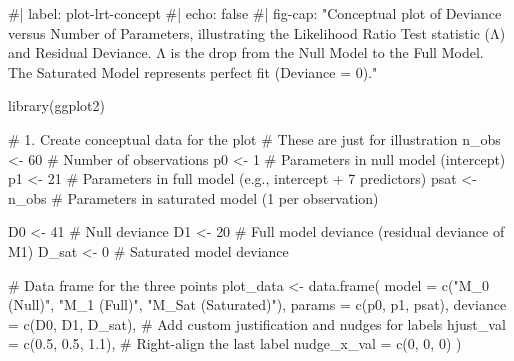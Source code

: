 \documentclass[
  letterpaper,
]{scrbook}
\newenvironment{Shaded}{\begin{snugshade}}{\end{snugshade}}
\newcommand{\AttributeTok}[1]{\textcolor[rgb]{0.40,0.45,0.13}{#1}}
\newcommand{\CommentTok}[1]{\textcolor[rgb]{0.37,0.37,0.37}{#1}}
\newcommand{\DecValTok}[1]{\textcolor[rgb]{0.68,0.00,0.00}{#1}}
\newcommand{\FloatTok}[1]{\textcolor[rgb]{0.68,0.00,0.00}{#1}}
\newcommand{\FunctionTok}[1]{\textcolor[rgb]{0.28,0.35,0.67}{#1}}
\newcommand{\NormalTok}[1]{\textcolor[rgb]{0.00,0.23,0.31}{#1}}
\newcommand{\OtherTok}[1]{\textcolor[rgb]{0.00,0.23,0.31}{#1}}
\newcommand{\StringTok}[1]{\textcolor[rgb]{0.13,0.47,0.30}{#1}}
\begin{document}
\begin{Shaded}
\begin{Highlighting}[]
\CommentTok{\#| label: plot{-}lrt{-}concept}
\CommentTok{\#| echo: false}
\CommentTok{\#| fig{-}cap: "Conceptual plot of Deviance versus Number of Parameters, illustrating the Likelihood Ratio Test statistic (Λ) and Residual Deviance. Λ is the drop from the Null Model to the Full Model. The Saturated Model represents perfect fit (Deviance = 0)."}

\FunctionTok{library}\NormalTok{(ggplot2)}

\CommentTok{\# 1. Create conceptual data for the plot}
\CommentTok{\# These are just for illustration}
\NormalTok{n\_obs }\OtherTok{\textless{}{-}} \DecValTok{60} \CommentTok{\# Number of observations}
\NormalTok{p0 }\OtherTok{\textless{}{-}} \DecValTok{1}     \CommentTok{\# Parameters in null model (intercept)}
\NormalTok{p1 }\OtherTok{\textless{}{-}} \DecValTok{21}    \CommentTok{\# Parameters in full model (e.g., intercept + 7 predictors)}
\NormalTok{psat }\OtherTok{\textless{}{-}}\NormalTok{ n\_obs }\CommentTok{\# Parameters in saturated model (1 per observation)}

\NormalTok{D0 }\OtherTok{\textless{}{-}} \DecValTok{41} \CommentTok{\# Null deviance}
\NormalTok{D1 }\OtherTok{\textless{}{-}} \DecValTok{20} \CommentTok{\# Full model deviance (residual deviance of M1)}
\NormalTok{D\_sat }\OtherTok{\textless{}{-}} \DecValTok{0} \CommentTok{\# Saturated model deviance}

\CommentTok{\# Data frame for the three points}
\NormalTok{plot\_data }\OtherTok{\textless{}{-}} \FunctionTok{data.frame}\NormalTok{(}
  \AttributeTok{model =} \FunctionTok{c}\NormalTok{(}\StringTok{"M\_0 (Null)"}\NormalTok{, }\StringTok{"M\_1 (Full)"}\NormalTok{, }\StringTok{"M\_Sat (Saturated)"}\NormalTok{),}
  \AttributeTok{params =} \FunctionTok{c}\NormalTok{(p0, p1, psat),}
  \AttributeTok{deviance =} \FunctionTok{c}\NormalTok{(D0, D1, D\_sat),}
  \CommentTok{\# Add custom justification and nudges for labels}
  \AttributeTok{hjust\_val =} \FunctionTok{c}\NormalTok{(}\FloatTok{0.5}\NormalTok{, }\FloatTok{0.5}\NormalTok{, }\FloatTok{1.1}\NormalTok{), }\CommentTok{\# Right{-}align the last label}
  \AttributeTok{nudge\_x\_val =} \FunctionTok{c}\NormalTok{(}\DecValTok{0}\NormalTok{, }\DecValTok{0}\NormalTok{, }\DecValTok{0}\NormalTok{) }
\NormalTok{)}


\end{Highlighting}
\end{Shaded}
\end{document}
